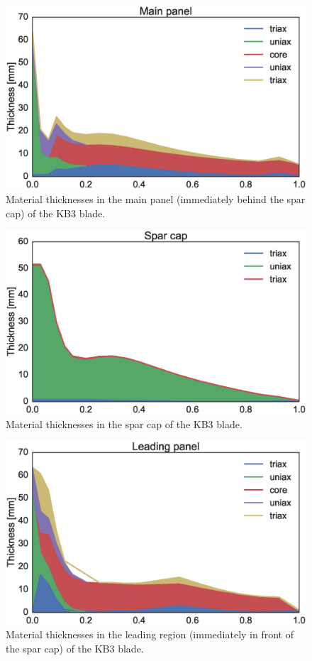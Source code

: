 \begin{figure}[pth]
\begin{center}
	\includegraphics[width=.85\linewidth]{figures/KB3_region02.eps}
\end{center}
\caption{Material thicknesses in the main panel (immediately behind the spar cap) of the KB3 blade.}
\label{fig:KB3matstackr02}
\end{figure}

\begin{figure}[pth]
\begin{center}
	\includegraphics[width=.85\linewidth]{figures/KB3_region04.eps}
\end{center}
\caption{Material thicknesses in the spar cap of the KB3 blade.}
\label{fig:KB3matstackr04}
\end{figure}

\begin{figure}[pth]
\begin{center}
	\includegraphics[width=.85\linewidth]{figures/KB3_region06.eps}
\end{center}
\caption{Material thicknesses in the leading region (immediately in front of the spar cap) of the KB3 blade.}
\label{fig:KB3matstackr06}
\end{figure}

